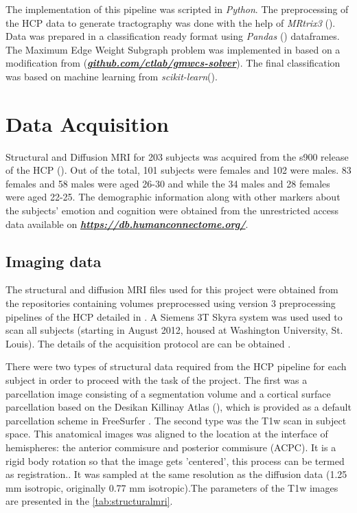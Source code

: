 \documentclass[msthesis.tex]{subfiles}
\begin{document}
The implementation of this pipeline was scripted in \textit{Python}. The preprocessing of the \gls{HCP} data to generate tractography was done with the help of \textit{MRtrix3} (\cite{tournier2019mrtrix3}).  Data was prepared in a classification ready format using \textit{Pandas} (\cite{mckinney2011pandas}) dataframes. The Maximum Edge Weight Subgraph problem was implemented in  based on a modification from \cite{DBLP:journals/corr/LobodaAS16} (\href{https://github.com/ctlab/gmwcs-solver}{\textbf{\textit{github.com/ctlab/gmwcs-solver}}}). The final classification was based on machine learning from \textit{scikit-learn}(\cite{sklearn_2012}). 

\section{Data Acquisition}
\label{sec:acquisition}
Structural and Diffusion MRI for 203 subjects was acquired from the s900 release of the \gls{HCP} (\cite{hcp2015wu}). Out of the total, 101 subjects were females and 102 were males. 83 females and 58 males were aged 26-30 and while the 34 males and 28 females were aged 22-25. The demographic information along with other markers about the subjects' emotion and cognition were obtained from the unrestricted access data available on \href{https://db.humanconnectome.org/}{\textbf{\textit{https://db.humanconnectome.org/}}}.

\subsection{Imaging data}
The structural and diffusion MRI files used for this project were obtained from the repositories containing volumes preprocessed using version 3 preprocessing pipelines of the \gls{HCP} detailed in \cite{GLASSER2013105}. A Siemens 3T Skyra system was used used to scan all subjects (starting in August 2012, housed at Washington University, St. Louis). The details of the acquisition protocol are can be obtained \cite{van2012human}.


There were two types of structural data required from the \gls{HCP} pipeline for each subject in order to proceed with the task of the project. The first was a parcellation image consisting of a segmentation volume and a cortical surface parcellation based on the Desikan Killinay Atlas (\cite{desikan2006automated}), which is provided as a default parcellation scheme in FreeSurfer \citep{fischl2012freesurfer}. The second type was the T1w scan in subject space. This anatomical images was aligned to the location at the interface of hemispheres: the anterior commisure and posterior commisure (ACPC). It is a rigid body rotation so that the image gets 'centered', this process can be termed as registration.. It was sampled at the same resolution as the diffusion data (1.25 mm isotropic, originally 0.77 mm isotropic).The parameters of the T1w images are presented in the \autoref{tab:structuralmri}.
\end{document}

